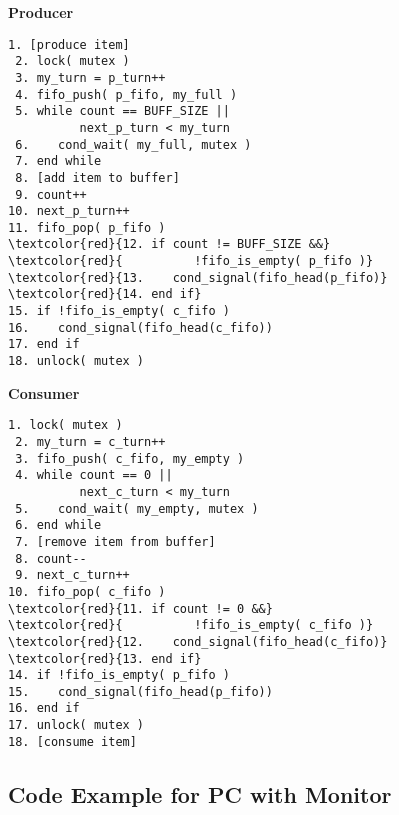 \begin{multicols}{2}
    \small
    \textbf{Producer}
    \begin{Verbatim}[commandchars=\\\{\}]
 1. [produce item]
 2. lock( mutex )
 3. my_turn = p_turn++
 4. fifo_push( p_fifo, my_full )
 5. while count == BUFF_SIZE ||
          next_p_turn < my_turn
 6.    cond_wait( my_full, mutex )
 7. end while
 8. [add item to buffer]
 9. count++
10. next_p_turn++
11. fifo_pop( p_fifo )
\textcolor{red}{12. if count != BUFF_SIZE &&}
\textcolor{red}{          !fifo_is_empty( p_fifo )}
\textcolor{red}{13.    cond_signal(fifo_head(p_fifo)}
\textcolor{red}{14. end if}
15. if !fifo_is_empty( c_fifo )
16.    cond_signal(fifo_head(c_fifo))
17. end if
18. unlock( mutex )
    \end{Verbatim}
    \columnbreak
    \textbf{Consumer}\vspace{-2em}
    \begin{Verbatim}[commandchars=\\\{\}]
 1. lock( mutex )
 2. my_turn = c_turn++
 3. fifo_push( c_fifo, my_empty )
 4. while count == 0 ||
          next_c_turn < my_turn
 5.    cond_wait( my_empty, mutex )
 6. end while
 7. [remove item from buffer]
 8. count--
 9. next_c_turn++
10. fifo_pop( c_fifo )
\textcolor{red}{11. if count != 0 &&}
\textcolor{red}{          !fifo_is_empty( c_fifo )}
\textcolor{red}{12.    cond_signal(fifo_head(c_fifo)}
\textcolor{red}{13. end if}
14. if !fifo_is_empty( p_fifo )
15.    cond_signal(fifo_head(p_fifo))
16. end if
17. unlock( mutex )
18. [consume item]
    \end{Verbatim}
\end{multicols}
\vspace{-2em}

\subsection*{Code Example for PC with Monitor}

